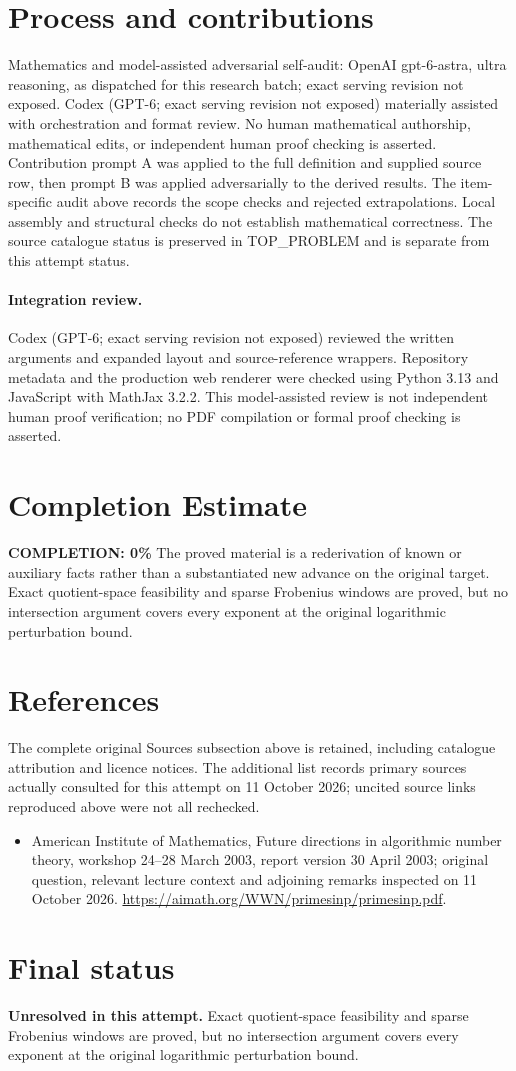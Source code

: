 \documentclass[11pt]{article}
\begin{document}
\section{Process and contributions}
Mathematics and model-assisted adversarial self-audit: OpenAI gpt-6-astra, ultra reasoning, as dispatched for this research batch; exact serving revision not exposed. Codex (GPT-6; exact serving revision not exposed) materially assisted with orchestration and format review. No human mathematical authorship, mathematical edits, or independent human proof checking is asserted.
Contribution prompt A was applied to the full definition and supplied source row, then prompt B was applied adversarially to the derived results. The item-specific audit above records the scope checks and rejected extrapolations. Local assembly and structural checks do not establish mathematical correctness. The source catalogue status is preserved in TOP\_PROBLEM and is separate from this attempt status.
\paragraph{Integration review.} Codex (GPT-6; exact serving revision not exposed) reviewed the written arguments and expanded layout and source-reference wrappers. Repository metadata and the production web renderer were checked using Python 3.13 and JavaScript with MathJax 3.2.2. This model-assisted review is not independent human proof verification; no PDF compilation or formal proof checking is asserted.

\section{Completion Estimate}
\noindent\textbf{COMPLETION: 0\%}
The proved material is a rederivation of known or auxiliary facts rather than a substantiated new advance on the original target. Exact quotient-space feasibility and sparse Frobenius windows are proved, but no intersection argument covers every exponent at the original logarithmic perturbation bound.
\section{References}
The complete original Sources subsection above is retained, including catalogue attribution and licence notices. The additional list records primary sources actually consulted for this attempt on 11 October 2026; uncited source links reproduced above were not all rechecked.
\begin{itemize}
\item American Institute of Mathematics, Future directions in algorithmic number theory, workshop 24--28 March 2003, report version 30 April 2003; original question, relevant lecture context and adjoining remarks inspected on 11 October 2026. \url{https://aimath.org/WWN/primesinp/primesinp.pdf}.
\end{itemize}
\section{Final status}
\textbf{Unresolved in this attempt.} Exact quotient-space feasibility and sparse Frobenius windows are proved, but no intersection argument covers every exponent at the original logarithmic perturbation bound.
\end{document}
